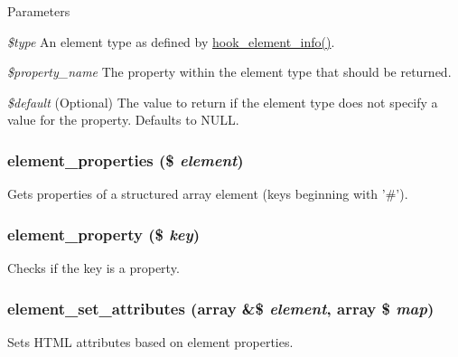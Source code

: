 \begin{DoxyParams}{Parameters}
\item[{\em \$type}]An element type as defined by \hyperlink{group__hooks_ga3c5182432eddc82f8b7845e66a365d51}{hook\_\-element\_\-info()}. \item[{\em \$property\_\-name}]The property within the element type that should be returned. \item[{\em \$default}](Optional) The value to return if the element type does not specify a value for the property. Defaults to NULL. \end{DoxyParams}
\hypertarget{common_8inc_a4ae6d339b27757556fe914f9d78d91e5}{
\subsubsection[{element\_\-properties}]{\setlength{\rightskip}{0pt plus 5cm}element\_\-properties (\$ {\em element})}}
\label{common_8inc_a4ae6d339b27757556fe914f9d78d91e5}
Gets properties of a structured array element (keys beginning with '\#'). \hypertarget{common_8inc_a7a93c74e138f24e5f7e672972644f1c3}{
\subsubsection[{element\_\-property}]{\setlength{\rightskip}{0pt plus 5cm}element\_\-property (\$ {\em key})}}
\label{common_8inc_a7a93c74e138f24e5f7e672972644f1c3}
Checks if the key is a property. \hypertarget{common_8inc_a117d5915f8fe2b93e65d662bcf69cba5}{
\subsubsection[{element\_\-set\_\-attributes}]{\setlength{\rightskip}{0pt plus 5cm}element\_\-set\_\-attributes (array \&\$ {\em element}, \/  array \$ {\em map})}}
\label{common_8inc_a117d5915f8fe2b93e65d662bcf69cba5}
Sets HTML attributes based on element properties.


